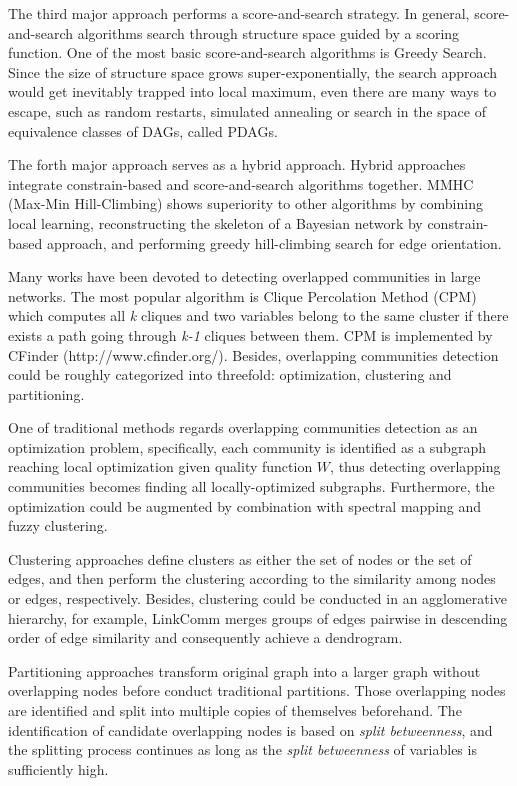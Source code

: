 The third major approach performs a score-and-search strategy. In general, score-and-search algorithms search through structure space guided by a scoring function. One of the most basic score-and-search algorithms is Greedy Search\cite{Brown05acomparison}. Since the size of structure space grows super-exponentially, the search approach would get inevitably trapped into local maximum, even there are many ways to escape, such as random restarts, simulated annealing or search in the space of equivalence classes of DAGs, called PDAGs.

The forth major approach serves as a hybrid approach. Hybrid approaches integrate constrain-based and score-and-search algorithms together. MMHC\cite{Tsamardinos06themax-min} (Max-Min Hill-Climbing) shows superiority to other algorithms by combining local learning, reconstructing the skeleton of a Bayesian network by constrain-based approach, and performing greedy hill-climbing search for edge orientation.

Many works have been devoted to detecting overlapped communities in large networks. The most popular algorithm is Clique Percolation Method (CPM)\cite{PalEtAl05} which computes all \emph{k} cliques and two variables belong to the same cluster if there exists a path going through \emph{k-1} cliques between them. CPM is implemented by CFinder\cite{cfinder} (http://www.cfinder.org/). Besides, overlapping communities detection could be roughly categorized into threefold: optimization, clustering and partitioning.

One of traditional methods regards overlapping communities detection as an optimization problem, specifically, each community is identified as a subgraph reaching local optimization given quality function $W$, thus detecting overlapping communities becomes finding all locally-optimized subgraphs\cite{Baumes04discoveringhidden}. Furthermore, the optimization could be augmented by combination with spectral mapping and fuzzy clustering\cite{ZhaWanZha07}.

Clustering approaches define clusters as either the set of nodes or the set of edges, and then perform the clustering according to the similarity among nodes\cite{nepusz07b} or edges\cite{YY_LC_nature2010}, respectively. Besides, clustering could be conducted in an agglomerative hierarchy, for example, LinkComm\cite{YY_LC_nature2010} merges groups of edges pairwise in descending order of edge similarity and consequently achieve a dendrogram.

Partitioning approaches transform original graph into a larger graph without overlapping nodes before conduct traditional partitions.
Those overlapping nodes are identified and split into multiple copies of themselves beforehand\cite{peacock}. The identification of candidate overlapping nodes is based on \emph{split betweenness}\cite{newman-girvan02}, and the splitting process continues as long as the \emph{split betweenness}
of variables is sufficiently high.



